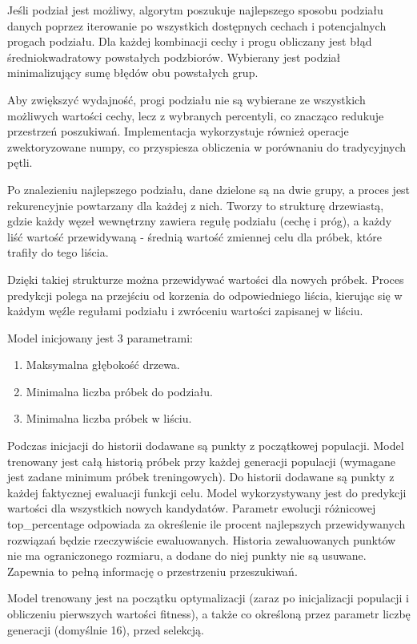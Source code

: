 \documentclass{article}
\begin{document}
Jeśli podział jest możliwy, algorytm poszukuje najlepszego sposobu podziału danych poprzez iterowanie po wszystkich dostępnych cechach i potencjalnych progach podziału. Dla każdej kombinacji cechy i progu obliczany jest błąd średniokwadratowy powstałych podzbiorów. Wybierany jest podział minimalizujący sumę błędów obu powstałych grup.

Aby zwiększyć wydajność, progi podziału nie są wybierane ze wszystkich możliwych wartości cechy, lecz z wybranych percentyli, co znacząco redukuje przestrzeń poszukiwań. Implementacja wykorzystuje również operacje zwektoryzowane numpy, co przyspiesza obliczenia w porównaniu do tradycyjnych pętli.

Po znalezieniu najlepszego podziału, dane dzielone są na dwie grupy, a proces jest rekurencyjnie powtarzany dla każdej z nich. Tworzy to strukturę drzewiastą, gdzie każdy węzeł wewnętrzny zawiera regułę podziału (cechę i próg), a każdy liść wartość przewidywaną - średnią wartość zmiennej celu dla próbek, które trafiły do tego liścia.

Dzięki takiej strukturze można przewidywać wartości dla nowych próbek. Proces predykcji polega na przejściu od korzenia do odpowiedniego liścia, kierując się w każdym węźle regułami podziału i zwróceniu wartości zapisanej w liściu.

Model inicjowany jest 3 parametrami:
\begin{enumerate}
    \item Maksymalna głębokość drzewa.
    \item Minimalna liczba próbek do podziału.
    \item Minimalna liczba próbek w liściu.
\end{enumerate}

Podczas inicjacji do historii dodawane są punkty z początkowej populacji.
Model trenowany jest całą historią próbek przy każdej generacji populacji (wymagane jest zadane minimum próbek treningowych). Do historii dodawane są punkty z każdej faktycznej ewaluacji funkcji celu.
Model wykorzystywany jest do predykcji wartości dla wszystkich nowych kandydatów. Parametr ewolucji różnicowej top\_percentage odpowiada za określenie ile procent najlepszych przewidywanych rozwiązań będzie rzeczywiście ewaluowanych. Historia zewaluowanych punktów nie ma ograniczonego rozmiaru, a dodane do niej punkty nie są usuwane. Zapewnia to pełną informację o przestrzeniu przeszukiwań.

Model trenowany jest na początku optymalizacji (zaraz po inicjalizacji populacji i obliczeniu pierwszych wartości fitness), a także co określoną przez parametr liczbę generacji (domyślnie 16), przed selekcją. 
\end{document}
